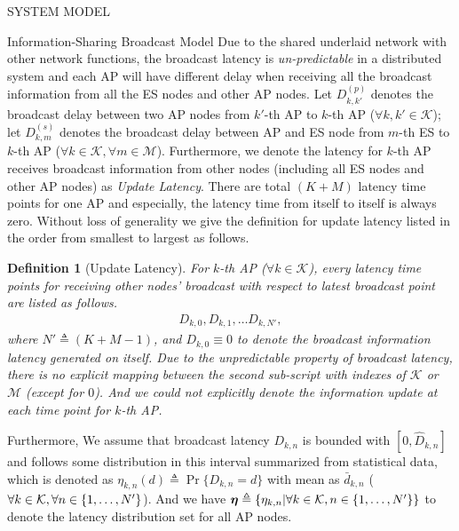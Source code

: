 \documentclass[10pt, conference, letterpaper]{IEEEtran}
\newtheorem{definition}{Definition}
\newcommand{\define}{\triangleq}
\newcommand{\vecG}{\boldsymbol}
\DeclarePairedDelimiter{\set}{\{}{\}}
\newcommand{\apSet}{\mathcal{K}}
\newcommand{\esSet}{\mathcal{M}}
\begin{document}
\begin{section}{SYSTEM MODEL}
\begin{subsection}{Information-Sharing Broadcast Model}
            {\color{red}Due to the shared underlaid network with other network functions, the broadcast latency is \emph{un-predictable} in a distributed system and each AP will have different delay when receiving all the broadcast information from all the ES nodes and other AP nodes.}
            Let $D^{(p)}_{k,k'}$ denotes the broadcast delay between two AP nodes from $k'$-th AP to $k$-th AP ($\forall k,k'\in\apSet$); let $D^{(s)}_{k,m}$ denotes the broadcast delay between AP and ES node from $m$-th ES to $k$-th AP ($\forall k\in\apSet,\forall m\in\esSet$).
            Furthermore, we denote the latency for $k$-th AP receives broadcast information from other nodes (including all ES nodes and other AP nodes) as \emph{Update Latency}. There are total $(K+M)$ latency time points for one AP and especially, the latency time from itself to itself is always zero. Without loss of generality we give the definition for update latency listed in the order from smallest to largest as follows.
            \begin{definition}[Update Latency]
                For $k$-th AP ($\forall k\in\apSet$), every latency time points for receiving other nodes' broadcast with respect to latest broadcast point are listed as follows.
                \begin{align}
                    D_{k,0}, D_{k,1}, \dots D_{k,N'},
                \end{align}
                where $N'\define(K+M-1)$, and $D_{k,0}\equiv0$ to denote the broadcast information latency generated on itself. Due to the unpredictable property of broadcast latency, there is no explicit mapping between the second sub-script with indexes of $\apSet$ or $\esSet$ (except for $0$). And we could not explicitly denote the information update at each time point for $k$-th AP.
            \end{definition}
            {\color{red}Furthermore, We assume that broadcast latency $D_{k,n}$ is bounded with $[0, \hat{D}_{k,n}]$ and follows some distribution in this interval summarized from statistical data, which is denoted as $\eta_{k,n}(d) \define \Pr\{D_{k,n}=d\}$ with mean as $\bar{d}_{k,n}$ ($\forall k\in\apSet,\forall n\in\set{1,\dots,N'}$).
            And we have $\vecG{\eta} \define \set{\eta_{k,n}|\forall k\in\apSet,n\in\set{1,\dots,N'}}$ to denote the latency distribution set for all AP nodes.}


\end{subsection}
\end{section}
\end{document}
